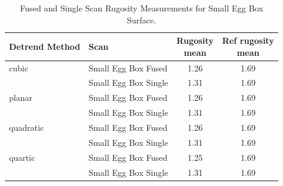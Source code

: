 \begin{table}[ht]
	\centering
	\small
	\setlength{\tabcolsep}{8pt}
	\caption{Fused and Single Scan Rugosity Measurements for Small Egg Box Surface.}
	\label{tab:Small_Egg_Rugosity}
	\begin{tabular}{l l c c}
		\toprule
		Detrend Method & Scan & \makecell{Rugosity\\{\footnotesize mean}} & \makecell{Ref rugosity\\{\footnotesize mean}} \\
		\midrule
		cubic & Small Egg Box Fused & 1.26 & 1.69 \\
		 & Small Egg Box Single & 1.31 & 1.69 \\
		\addlinespace
		planar & Small Egg Box Fused & 1.26 & 1.69 \\
		 & Small Egg Box Single & 1.31 & 1.69 \\
		\addlinespace
		quadratic & Small Egg Box Fused & 1.26 & 1.69 \\
		 & Small Egg Box Single & 1.31 & 1.69 \\
		\addlinespace
		quartic & Small Egg Box Fused & 1.25 & 1.69 \\
		 & Small Egg Box Single & 1.31 & 1.69 \\
		\bottomrule
	\end{tabular}
\end{table}

